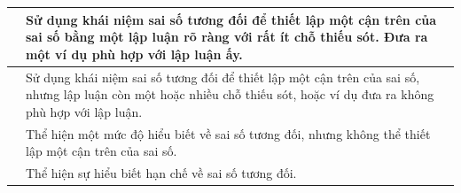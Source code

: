 \documentclass[varwidth,border=6pt]{standalone}
\begin{document}
{\sffamily\small
\renewcommand{\arraystretch}{1.22}
\begin{tabular}{|>{\centering\arraybackslash}m{0.95cm}|>{\RaggedRight\arraybackslash}m{6.1cm}|}
\hline
4 &
Sử dụng khái niệm sai số tương đối để thiết lập một cận trên của sai số bằng một lập luận rõ ràng với rất ít chỗ thiếu sót. Đưa ra một ví dụ phù hợp với lập luận ấy. \\
\hline
3 &
Sử dụng khái niệm sai số tương đối để thiết lập một cận trên của sai số, nhưng lập luận còn một hoặc nhiều chỗ thiếu sót, hoặc ví dụ đưa ra không phù hợp với lập luận. \\
\hline
2 &
Thể hiện một mức độ hiểu biết về sai số tương đối, nhưng không thể thiết lập một cận trên của sai số. \\
\hline
1 &
Thể hiện sự hiểu biết hạn chế về sai số tương đối. \\
\hline
\end{tabular}
}
\end{document}
